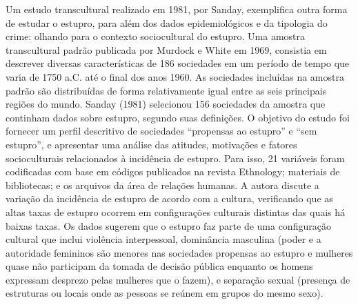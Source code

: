 Um estudo transcultural realizado em 1981, por Sanday, exemplifica outra forma de estudar o estupro, para além dos dados epidemiológicos e da tipologia do crime: olhando para o contexto sociocultural do estupro. Uma amostra transcultural padrão publicada por Murdock e White em 1969, consistia em descrever diversas características de 186 sociedades em um período de tempo que varia de 1750 a.C. até o final dos anos 1960. As sociedades incluídas na amostra padrão são distribuídas de forma relativamente igual entre as seis principais regiões do mundo. Sanday (1981) selecionou 156 sociedades da amostra que continham dados sobre estupro, segundo suas definições. O objetivo do estudo foi fornecer um perfil descritivo de sociedades ``propensas ao estupro'' e ``sem estupro'', e apresentar uma análise das atitudes, motivações e fatores socioculturais relacionados à incidência de estupro. Para isso, 21 variáveis foram codificadas com base em códigos publicados na revista Ethnology; materiais de bibliotecas; e os arquivos da área de relações humanas. A autora discute a variação da incidência de estupro de acordo com a cultura, verificando que as altas taxas de estupro ocorrem em configurações culturais distintas das quais há baixas taxas. Os dados sugerem que o estupro faz parte de uma configuração cultural que inclui violência interpessoal, dominância masculina (poder e a autoridade femininos são menores nas sociedades propensas ao estupro e mulheres quase não participam da tomada de decisão pública enquanto os homens expressam desprezo pelas mulheres que o fazem), e separação sexual (presença de estruturas ou locais onde as pessoas se reúnem em grupos do mesmo sexo).

